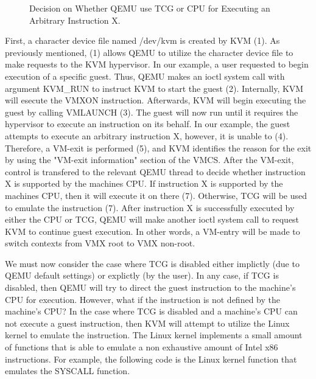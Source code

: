 \documentclass{report}
\begin{document}
\begin{spacing}{1.5}
\vfill
{}
\begin{figure}[ht]
    \centering
    \caption{Decision on Whether QEMU use TCG or CPU for Executing an Arbitrary Instruction X.}
\end{figure}




{\large
\noindent First, a character device file named /dev/kvm is created by KVM (1). As previously mentioned, (1) allows QEMU to utilize the character device file to make requests to the KVM hypervisor. In our example, a user requested to begin execution of a specific guest. Thus, QEMU makes an ioctl system call with argument KVM\_RUN to instruct KVM to start the guest (2). Internally, KVM will esecute the VMXON instruction. Afterwards, KVM will begin executing the guest by calling VMLAUNCH (3). The guest will now run until it requires the hypervisor to execute an instruction on its behalf. In our example, the guest attempts to execute an arbitrary instruction X, however, it is unable to (4). Therefore, a VM-exit is performed (5), and KVM identifies the reason for the exit by using the "VM-exit information" section of the VMCS. After the VM-exit, control is transfered to the relevant QEMU thread to decide whether instruction X is supported by the machines CPU. If instruction X is supported by the machines CPU, then it will execute it on there (7). Otherwise, TCG will be used to emulate the instruction (7). After instruction X is successfully executed by either the CPU or TCG, QEMU will make another ioctl system call to request KVM to continue guest execution. In other words, a VM-entry will be made to switch contexts from VMX root to VMX non-root.
\newline
}


{\large
\noindent We must now consider the case where TCG is disabled either implictly (due to QEMU default settings) or explictly (by the user). In any case, if TCG is disabled, then QEMU will try to direct the guest instruction to the machine's CPU for execution. However, what if the instruction is not defined by the machine's CPU? In the case where TCG is disabled and a machine's CPU can not execute a guest instruction, then KVM will attempt to utilize the Linux kernel to emulate the instruction. The Linux kernel implements a small amount of functions that is able to emulate a non exhaustive amount of Intel x86 instructions. For example, the following code is the Linux kernel function that emulates the SYSCALL function. 
\newline
}


\end{spacing}
\end{document}
